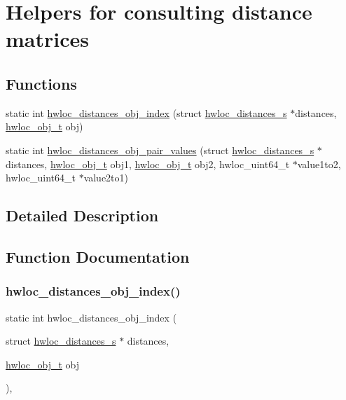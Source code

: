 \hypertarget{a00209}{}\section{Helpers for consulting distance matrices}
\label{a00209}
\subsection*{Functions}
\begin{DoxyCompactItemize}
\item 
static int \hyperlink{a00209_gab9e770c7d56c5d6040f26bd1dc8854cd}{hwloc\+\_\+distances\+\_\+obj\+\_\+index} (struct \hyperlink{a00310}{hwloc\+\_\+distances\+\_\+s} $\ast$distances, \hyperlink{a00185_ga79b8ab56877ef99ac59b833203391c7d}{hwloc\+\_\+obj\+\_\+t} obj)
\item 
static int \hyperlink{a00209_ga3c665b23056e3269f777b21a67148c82}{hwloc\+\_\+distances\+\_\+obj\+\_\+pair\+\_\+values} (struct \hyperlink{a00310}{hwloc\+\_\+distances\+\_\+s} $\ast$distances, \hyperlink{a00185_ga79b8ab56877ef99ac59b833203391c7d}{hwloc\+\_\+obj\+\_\+t} obj1, \hyperlink{a00185_ga79b8ab56877ef99ac59b833203391c7d}{hwloc\+\_\+obj\+\_\+t} obj2, hwloc\+\_\+uint64\+\_\+t $\ast$value1to2, hwloc\+\_\+uint64\+\_\+t $\ast$value2to1)
\end{DoxyCompactItemize}


\subsection{Detailed Description}


\subsection{Function Documentation}
\mbox{\label{a00209_gab9e770c7d56c5d6040f26bd1dc8854cd}} 
\subsubsection{\texorpdfstring{hwloc\+\_\+distances\+\_\+obj\+\_\+index()}{hwloc\_distances\_obj\_index()}}
{\footnotesize\ttfamily static int hwloc\+\_\+distances\+\_\+obj\+\_\+index (\begin{DoxyParamCaption}\item[{struct \hyperlink{a00310}{hwloc\+\_\+distances\+\_\+s} $\ast$}]{distances,  }\item[{\hyperlink{a00185_ga79b8ab56877ef99ac59b833203391c7d}{hwloc\+\_\+obj\+\_\+t}}]{obj }\end{DoxyParamCaption})\hspace{0.3cm}{\ttfamily [inline]}, {\ttfamily [static]}}



